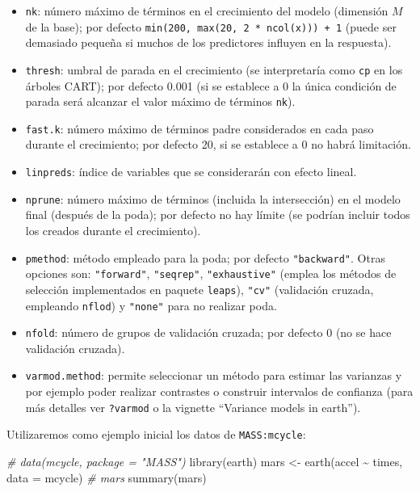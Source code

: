 \documentclass[
]{book}
\newenvironment{Shaded}{\begin{snugshade}}{\end{snugshade}}
\newcommand{\AttributeTok}[1]{\textcolor[rgb]{0.77,0.63,0.00}{#1}}
\newcommand{\CommentTok}[1]{\textcolor[rgb]{0.56,0.35,0.01}{\textit{#1}}}
\newcommand{\FunctionTok}[1]{\textcolor[rgb]{0.00,0.00,0.00}{#1}}
\newcommand{\NormalTok}[1]{#1}
\newcommand{\OtherTok}[1]{\textcolor[rgb]{0.56,0.35,0.01}{#1}}
\newcommand{\SpecialCharTok}[1]{\textcolor[rgb]{0.00,0.00,0.00}{#1}}
\theoremstyle{break}
\theoremstyle{definition}
\theoremstyle{definition}
\theoremstyle{definition}
\theoremstyle{definition}
\theoremstyle{remark}
\begin{document}
\begin{itemize}
\item
  \texttt{nk}: número máximo de términos en el crecimiento del modelo (dimensión \(M\) de la base); por defecto \texttt{min(200,\ max(20,\ 2\ *\ ncol(x)))\ +\ 1} (puede ser demasiado pequeña si muchos de los predictores influyen en la respuesta).
\item
  \texttt{thresh}: umbral de parada en el crecimiento (se interpretaría como \texttt{cp} en los árboles CART); por defecto 0.001 (si se establece a 0 la única condición de parada será alcanzar el valor máximo de términos \texttt{nk}).
\item
  \texttt{fast.k}: número máximo de términos padre considerados en cada paso durante el crecimiento; por defecto 20, si se establece a 0 no habrá limitación.
\item
  \texttt{linpreds}: índice de variables que se considerarán con efecto lineal.
\item
  \texttt{nprune}: número máximo de términos (incluida la intersección) en el modelo final (después de la poda); por defecto no hay límite (se podrían incluir todos los creados durante el crecimiento).
\item
  \texttt{pmethod}: método empleado para la poda; por defecto \texttt{"backward"}. Otras opciones son: \texttt{"forward"}, \texttt{"seqrep"}, \texttt{"exhaustive"} (emplea los métodos de selección implementados en paquete \texttt{leaps}), \texttt{"cv"} (validación cruzada, empleando \texttt{nflod}) y \texttt{"none"} para no realizar poda.
\item
  \texttt{nfold}: número de grupos de validación cruzada; por defecto 0 (no se hace validación cruzada).
\item
  \texttt{varmod.method}: permite seleccionar un método para estimar las varianzas y por ejemplo poder realizar contrastes o construir intervalos de confianza (para más detalles ver \texttt{?varmod} o la vignette ``Variance models in earth'').
\end{itemize}

Utilizaremos como ejemplo inicial los datos de \texttt{MASS:mcycle}:

\begin{Shaded}
\begin{Highlighting}[]
\CommentTok{\# data(mcycle, package = "MASS")}
\FunctionTok{library}\NormalTok{(earth)}
\NormalTok{mars }\OtherTok{\textless{}{-}} \FunctionTok{earth}\NormalTok{(accel }\SpecialCharTok{\textasciitilde{}}\NormalTok{ times, }\AttributeTok{data =}\NormalTok{ mcycle)}
\CommentTok{\# mars}
\FunctionTok{summary}\NormalTok{(mars)}
\end{Highlighting}
\end{Shaded}
\end{document}
